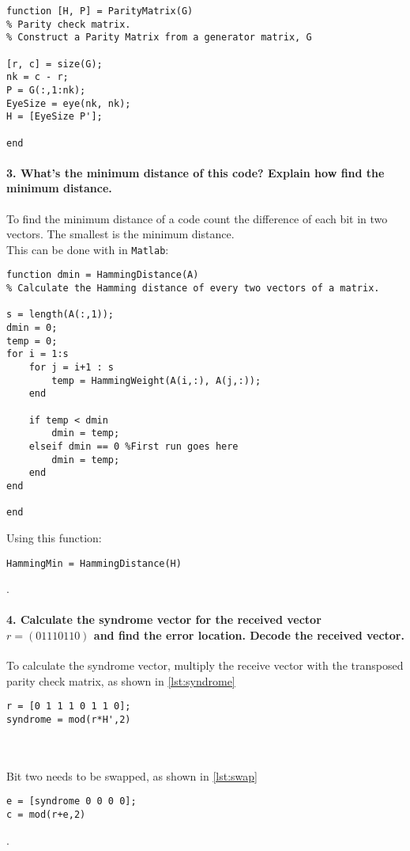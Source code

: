 \documentclass[Main]{subfiles}
\begin{document}
\begin{lstlisting}[caption=ParityMatrix, style=Code-Matlab, label=lst:Parity]
function [H, P] = ParityMatrix(G)
% Parity check matrix.
% Construct a Parity Matrix from a generator matrix, G

[r, c] = size(G);
nk = c - r;
P = G(:,1:nk);
EyeSize = eye(nk, nk);
H = [EyeSize P'];

end
\end{lstlisting}



\paragraph{3. What's the minimum distance of this code? Explain how find the
minimum distance.}
To find the minimum distance of a code count the difference of each bit in two vectors.
The smallest is the minimum distance.
\\
This can be done with in \texttt{Matlab}:

\begin{lstlisting}[caption=Minimum Hamming distance, style=Code-Matlab, label=lst:dmin]
function dmin = HammingDistance(A)
% Calculate the Hamming distance of every two vectors of a matrix.

s = length(A(:,1));
dmin = 0;
temp = 0;
for i = 1:s
    for j = i+1 : s
        temp = HammingWeight(A(i,:), A(j,:));
    end
    
    if temp < dmin
        dmin = temp;
    elseif dmin == 0 %First run goes here
        dmin = temp;
    end
end

end
\end{lstlisting}
Using this function:

\begin{lstlisting}[caption=Calculate the minimum distance, style=Code-Matlab, label=lst:]
HammingMin = HammingDistance(H)
\end{lstlisting}
.



\paragraph{4. Calculate the syndrome vector for the received vector $r = (01110110)$ and find the error location. Decode the received vector.}

To calculate the syndrome vector, multiply the receive vector with the transposed parity check matrix, as shown in \codeTitle \ref{lst:syndrome}


\begin{lstlisting}[caption=Syndrome vector, style=Code-Matlab, label=lst:syndrome]
r = [0 1 1 1 0 1 1 0];
syndrome = mod(r*H',2)
\end{lstlisting}
\\
\\
Bit two needs to be swapped, as shown in \codeTitle \ref{lst:swap}

\begin{lstlisting}[caption=Swapping 2 bit, style=Code-Matlab, label=lst:swap]
e = [syndrome 0 0 0 0];
c = mod(r+e,2)
\end{lstlisting}
.
\end{document}
